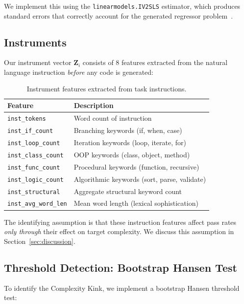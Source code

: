 \documentclass[conference]{IEEEtran}
\begin{document}
We implement this using the \texttt{linearmodels.IV2SLS} estimator, which produces standard errors that correctly account for the generated regressor problem~\cite{wooldridge2010econometric}.

\subsection{Instruments}

Our instrument vector $\mathbf{Z}_i$ consists of 8 features extracted from the natural language instruction \emph{before} any code is generated:

\begin{table}[h]
\centering
\caption{Instrument features extracted from task instructions.}
\label{tab:instruments}
\begin{tabular}{@{}ll@{}}
\toprule
Feature & Description \\
\midrule
\texttt{inst\_tokens} & Word count of instruction \\
\texttt{inst\_if\_count} & Branching keywords (if, when, case) \\
\texttt{inst\_loop\_count} & Iteration keywords (loop, iterate, for) \\
\texttt{inst\_class\_count} & OOP keywords (class, object, method) \\
\texttt{inst\_func\_count} & Procedural keywords (function, recursive) \\
\texttt{inst\_logic\_count} & Algorithmic keywords (sort, parse, validate) \\
\texttt{inst\_structural} & Aggregate structural keyword count \\
\texttt{inst\_avg\_word\_len} & Mean word length (lexical sophistication) \\
\bottomrule
\end{tabular}
\end{table}

The identifying assumption is that these instruction features affect pass rates \emph{only through} their effect on target complexity. We discuss this assumption in Section~\ref{sec:discussion}.

\subsection{Threshold Detection: Bootstrap Hansen Test}

To identify the Complexity Kink, we implement a bootstrap Hansen threshold test:
\end{document}
